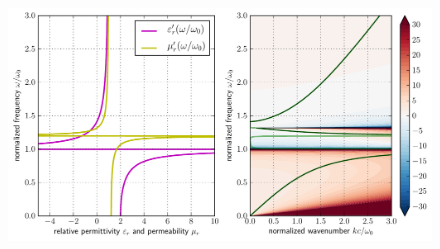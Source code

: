 \begin{figure}[ht] \caption{} \label{fg_dcllelmag} \centering  %
	\includegraphics[width=17cm]{img/dispersion_landau_lifshitz/dispersion_ll_elmag.pdf}
\end{figure}

